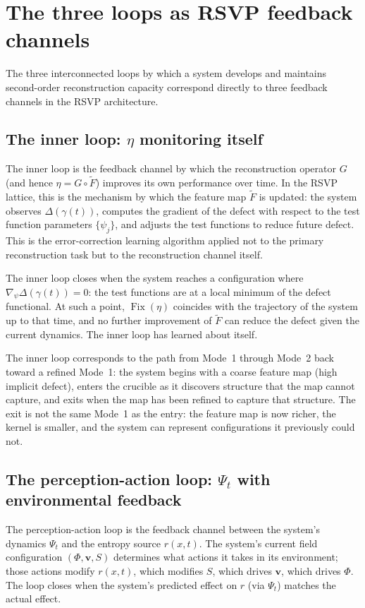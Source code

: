\documentclass[12pt, oneside]{memoir}
\DeclareMathOperator{\Fix}{Fix}
\newcommand{\Ft}{\widetilde{F}}
\newcommand{\bv}{\mathbf{v}}
\begin{document}
\section{The three loops as RSVP feedback channels}
\label{sec:three-loops}

The three interconnected loops by which a system develops and maintains second-order
reconstruction capacity correspond directly to three feedback channels in the RSVP
architecture.

\subsection{The inner loop: $\eta$ monitoring itself}

The inner loop is the feedback channel by which the reconstruction operator $G$ (and
hence $\eta = G \circ \Ft$) improves its own performance over time.  In the RSVP
lattice, this is the mechanism by which the feature map $\Ft$ is updated: the system
observes $\Delta(\gamma(t))$, computes the gradient of the defect with respect to the
test function parameters $\{\psi_j\}$, and adjusts the test functions to reduce future
defect.  This is the error-correction learning algorithm applied not to the primary
reconstruction task but to the reconstruction channel itself.

The inner loop closes when the system reaches a configuration where $\nabla_\psi
\Delta(\gamma(t)) = 0$: the test functions are at a local minimum of the defect
functional.  At such a point, $\Fix(\eta)$ coincides with the trajectory of the system
up to that time, and no further improvement of $\Ft$ can reduce the defect given the
current dynamics.  The inner loop has learned about itself.

The inner loop corresponds to the path from Mode~1 through Mode~2 back toward a refined
Mode~1: the system begins with a coarse feature map (high implicit defect), enters the
crucible as it discovers structure that the map cannot capture, and exits when the map
has been refined to capture that structure.  The exit is not the same Mode~1 as the
entry: the feature map is now richer, the kernel is smaller, and the system can
represent configurations it previously could not.

\subsection{The perception-action loop: $\Psi_t$ with environmental feedback}

The perception-action loop is the feedback channel between the system's dynamics
$\Psi_t$ and the entropy source $r(x,t)$.  The system's current field configuration
$(\Phi, \bv, S)$ determines what actions it takes in its environment; those actions
modify $r(x,t)$, which modifies $S$, which drives $\bv$, which drives $\Phi$.  The loop
closes when the system's predicted effect on $r$ (via $\Psi_t$) matches the actual
effect.
\end{document}

